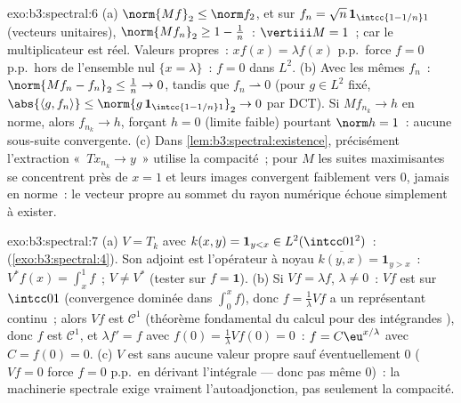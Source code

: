 \begin{solution}{exo:b3:spectral:6}
(a) $\norm{Mf}_2 \leq \norm f_2$, et sur $f_n = \sqrt n\,
\mathbf 1_{\intcc{1 - 1/n}1}$ (vecteurs unitaires),
$\norm{Mf_n}_2 \geq 1 - \frac1n$~: $\vertiii M = 1$~;
 car le multiplicateur est réel. Valeurs
propres~: $xf(x) = \lambda f(x)$ p.p.\ force $f = 0$ p.p.\
hors de l'ensemble nul $\{x = \lambda\}$~: $f = 0$ dans
$L^2$.
(b) Avec les mêmes $f_n$~: $\norm{Mf_n - f_n}_2 \leq \frac1n
\to 0$, tandis que $f_n \rightharpoonup 0$ (pour $g \in L^2$
fixé, $\abs{\langle g, f_n\rangle} \leq \norm{g\,\mathbf
1_{\intcc{1-1/n}1}}_2 \to 0$ par DCT). Si $Mf_{n_k} \to h$ en
norme, alors $f_{n_k} \to h$, forçant $h = 0$ (limite
faible) pourtant $\norm h = 1$~: aucune sous-suite
convergente.
(c) Dans \cref{lem:b3:spectral:existence}, précisément
l'extraction «~$Tx_{n_k} \to y$~» utilise la compacité~; pour
$M$ les suites maximisantes se concentrent près de $x = 1$ et
leurs images convergent faiblement vers $0$, jamais en
norme~: le vecteur propre au sommet du rayon numérique
échoue simplement à exister.
\end{solution}

\begin{solution}{exo:b3:spectral:7}
(a) $V = T_k$ avec $k(x, y) = \mathbf 1_{y < x} \in
L^2(\intcc01^2)$~:  (\cref{exo:b3:spectral:4}). Son
adjoint est l'opérateur à noyau $\overline{k(y, x)} =
\mathbf 1_{y > x}$~: $V^*f(x) = \int_x^1f$~; $V \neq V^*$
(tester sur $f = \mathbf 1$).
(b) Si $Vf = \lambda f$, $\lambda \ne 0$~: $Vf$ est 
sur $\intcc01$ (convergence dominée dans $\int_0^x f$), donc
$f = \frac1\lambda Vf$ a un représentant continu~; alors $Vf$
est $\mathcal C^1$ (théorème fondamental du calcul pour des
intégrandes ), donc $f$ est $\mathcal C^1$, et
$\lambda f' = f$ avec $f(0) = \frac1\lambda Vf(0) = 0$~: $f
= C\eu^{x/\lambda}$ avec $C = f(0) = 0$.
(c) $V$ est  sans aucune valeur propre sauf
éventuellement $0$ ($Vf = 0$ force $f = 0$ p.p.\ en dérivant
l'intégrale --- donc pas même $0$)~: la machinerie spectrale
exige vraiment l'autoadjonction, pas seulement la
compacité.
\end{solution}

